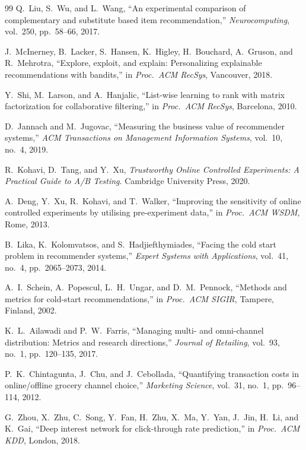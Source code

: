 \documentclass[conference]{IEEEtran}
\begin{document}
\begin{thebibliography}{99}
Q.\ Liu, S.\ Wu, and L.\ Wang, ``An experimental comparison of complementary
and substitute based item recommendation,'' \textit{Neurocomputing}, vol.\ 250,
pp.\ 58--66, 2017.

J.\ McInerney, B.\ Lacker, S.\ Hansen, K.\ Higley, H.\ Bouchard,
A.\ Gruson, and R.\ Mehrotra, ``Explore, exploit, and explain: Personalizing
explainable recommendations with bandits,'' in \textit{Proc.\ ACM RecSys},
Vancouver, 2018.

Y.\ Shi, M.\ Larson, and A.\ Hanjalic, ``List-wise learning to rank with
matrix factorization for collaborative filtering,'' in \textit{Proc.\ ACM
RecSys}, Barcelona, 2010.

D.\ Jannach and M.\ Jugovac, ``Measuring the business value of recommender
systems,'' \textit{ACM Transactions on Management Information Systems},
vol.\ 10, no.\ 4, 2019.

R.\ Kohavi, D.\ Tang, and Y.\ Xu, \textit{Trustworthy Online Controlled
Experiments: A Practical Guide to A/B Testing}. Cambridge University Press, 2020.

A.\ Deng, Y.\ Xu, R.\ Kohavi, and T.\ Walker, ``Improving the sensitivity of
online controlled experiments by utilising pre-experiment data,'' in
\textit{Proc.\ ACM WSDM}, Rome, 2013.

B.\ Lika, K.\ Kolomvatsos, and S.\ Hadjiefthymiades, ``Facing the cold start
problem in recommender systems,'' \textit{Expert Systems with Applications},
vol.\ 41, no.\ 4, pp.\ 2065--2073, 2014.

A.\ I.\ Schein, A.\ Popescul, L.\ H.\ Ungar, and D.\ M.\ Pennock,
``Methods and metrics for cold-start recommendations,'' in \textit{Proc.\ ACM
SIGIR}, Tampere, Finland, 2002.

K.\ L.\ Ailawadi and P.\ W.\ Farris, ``Managing multi- and omni-channel
distribution: Metrics and research directions,'' \textit{Journal of
Retailing}, vol.\ 93, no.\ 1, pp.\ 120--135, 2017.

P.\ K.\ Chintagunta, J.\ Chu, and J.\ Cebollada, ``Quantifying transaction
costs in online/offline grocery channel choice,'' \textit{Marketing Science},
vol.\ 31, no.\ 1, pp.\ 96--114, 2012.

G.\ Zhou, X.\ Zhu, C.\ Song, Y.\ Fan, H.\ Zhu, X.\ Ma, Y.\ Yan, J.\ Jin,
H.\ Li, and K.\ Gai, ``Deep interest network for click-through rate
prediction,'' in \textit{Proc.\ ACM KDD}, London, 2018.


\end{thebibliography}
\end{document}

